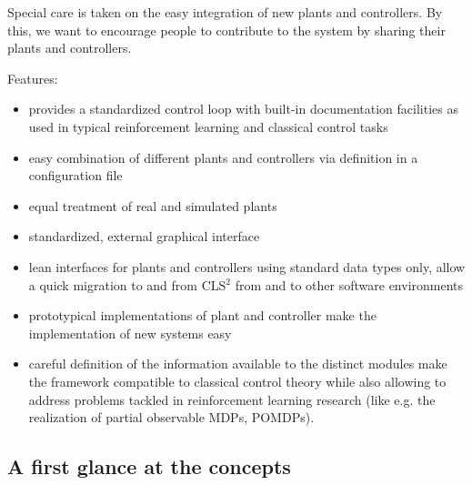 \documentclass[a4paper,12pt,german]{article}
\newcommand{\cls}{{CLS$^2$ }}
\newcommand{\ite}{\begin{itemize}}
\newcommand{\eti}{\end{itemize}}
\begin{document}
Special care is taken on the easy integration of new plants and
controllers. By this, we want to encourage people to contribute to the
system by sharing their plants and controllers.

Features:

\ite
\item provides a standardized control loop with built-in documentation facilities as used in typical 
reinforcement learning and classical control tasks
\item easy combination of different plants and controllers via definition in a configuration file
\item equal treatment of real and simulated plants
\item standardized, external graphical interface
\item lean interfaces for plants and controllers using standard data types only, allow a quick
migration to and from \cls from and to other software environments
\item prototypical implementations of plant and controller make the implementation of new
systems easy
\item careful definition of the information available to the distinct modules 
make the framework compatible to classical control theory while also allowing
to address problems tackled in reinforcement learning research (like e.g.
the realization of partial observable MDPs, POMDPs).
\eti

\subsection{A first glance at the concepts}
\end{document}

